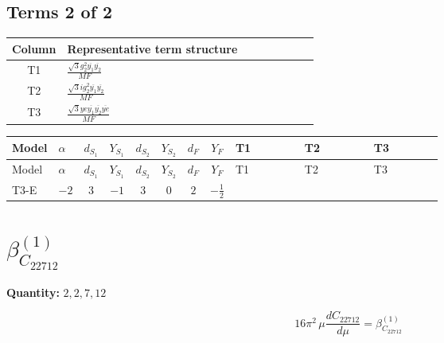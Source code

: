 \documentclass[8pt]{article}
\begin{document}
\begin{landscape}
\subsection*{Terms 2 of 2}
\begin{center}
\begin{tabular}{@{}c >{\raggedright\arraybackslash}p{0.82\linewidth}@{}}
\toprule
Column & Representative term structure \\
\midrule
T1 & \(\displaystyle \frac{\sqrt{3} g_{2}^{2} \overline{y_{1}} \overline{y_{2}}}{MF}\) \\
\midrule
T2 & \(\displaystyle \frac{\sqrt{3} i g_{2}^{2} \overline{y_{1}} \overline{y_{2}}}{MF}\) \\
\midrule
T3 & \(\displaystyle \frac{\sqrt{3} ye \overline{y_{1}} \overline{y_{2}} \overline{ye}}{MF}\) \\
\midrule
\bottomrule
\end{tabular}
\end{center}
\smallskip
\tiny
\begin{longtable}{@{}llcccccc >{\raggedright\arraybackslash}p{0.21\linewidth} >{\raggedright\arraybackslash}p{0.21\linewidth} >{\raggedright\arraybackslash}p{0.21\linewidth}@{}}
\toprule
Model & $\alpha$ & $d_{S_1}$ & $Y_{S_1}$ & $d_{S_2}$ & $Y_{S_2}$ & $d_F$ & $Y_F$ & T1 & T2 & T3 \\
\midrule
\endfirsthead
\toprule
Model & $\alpha$ & $d_{S_1}$ & $Y_{S_1}$ & $d_{S_2}$ & $Y_{S_2}$ & $d_F$ & $Y_F$ & T1 & T2 & T3 \\
\midrule
\endhead
T3-E & $-2$ & $3$ & $-1$ & $3$ & $0$ & $2$ & $-\frac{1}{2}$ & \scriptsize\adjustbox{max width=\linewidth}{$\begin{gathered} \frac{11 \sqrt{3} g_{2}^{2} \overline{y_{1}} \overline{y_{2}}}{8 MF}\end{gathered}$} & \scriptsize\adjustbox{max width=\linewidth}{$\begin{gathered} - \frac{\sqrt{3} i g_{2}^{2} \overline{y_{1}} \overline{y_{2}}}{6 MF}\end{gathered}$} & \scriptsize\adjustbox{max width=\linewidth}{$\begin{gathered} - \frac{\sqrt{3} ye \overline{y_{1}} \overline{y_{2}} \overline{ye}}{12 MF}\end{gathered}$} \\
\midrule
\bottomrule
\end{longtable}
\clearpage
\section*{$\beta_{C_{22712}}^{(1)}$}
\noindent\textbf{Quantity: }$\mathrm{2,2,7,12}$\par\smallskip
\[16\pi^2\,\mu\frac{d C_{22712}}{d\mu}=\beta_{C_{22712}}^{(1)}\]

\end{landscape}
\end{document}
